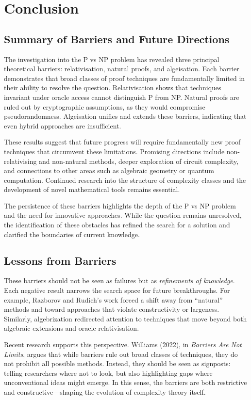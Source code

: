 \documentclass[12pt]{report}
\begin{document}
\newpage
\chapter{Conclusion}

\section{Summary of Barriers and Future Directions}
The investigation into the P vs NP problem has revealed three principal theoretical barriers: relativisation, natural proofs, and algeisation. Each barrier demonstrates that broad classes of proof techniques are fundamentally limited in their ability to resolve the question. Relativisation shows that techniques invariant under oracle access cannot distinguish P from NP. Natural proofs are ruled out by cryptographic assumptions, as they would compromise pseudorandomness. Algeisation unifies and extends these barriers, indicating that even hybrid approaches are insufficient.

These results suggest that future progress will require fundamentally new proof techniques that circumvent these limitations. Promising directions include non-relativising and non-natural methods, deeper exploration of circuit complexity, and connections to other areas such as algebraic geometry or quantum computation. Continued research into the structure of complexity classes and the development of novel mathematical tools remains essential.

The persistence of these barriers highlights the depth of the P vs NP problem and the need for innovative approaches. While the question remains unresolved, the identification of these obstacles has refined the search for a solution and clarified the boundaries of current knowledge.

\section{Lessons from Barriers}
These barriers should not be seen as failures but as \textit{refinements of knowledge}. Each negative result narrows the search space for future breakthroughs. For example, Razborov and Rudich's work forced a shift away from ``natural'' methods and toward approaches that violate constructivity or largeness. Similarly, algebrization redirected attention to techniques that move beyond both algebraic extensions and oracle relativisation.  

Recent research supports this perspective. Williams (2022), in \textit{Barriers Are Not Limits}, argues that while barriers rule out broad classes of techniques, they do not prohibit all possible methods. Instead, they should be seen as signposts: telling researchers where not to look, but also highlighting gaps where unconventional ideas might emerge. In this sense, the barriers are both restrictive and constructive---shaping the evolution of complexity theory itself.  
\end{document}
